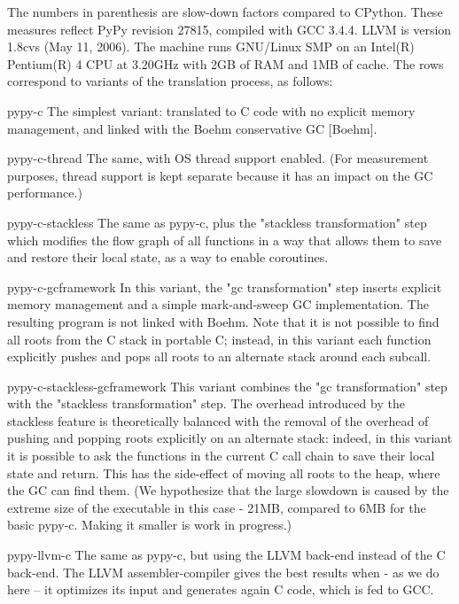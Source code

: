 \documentclass{acm_proc_article-sp}
\begin{document}
The numbers in parenthesis are slow-down factors compared to CPython.
These measures reflect PyPy revision 27815, compiled with GCC 3.4.4.
LLVM is version 1.8cvs (May 11, 2006).  The machine runs GNU/Linux SMP
on an Intel(R) Pentium(R) 4 CPU at 3.20GHz with 2GB of RAM and 1MB of
cache.  The rows correspond to variants of the translation process, as
follows:

pypy-c
    The simplest variant: translated to C code with no explicit memory
    management, and linked with the Boehm conservative GC [Boehm].

pypy-c-thread
    The same, with OS thread support enabled.  (For measurement purposes,
    thread support is kept separate because it has an impact on the GC
    performance.)

pypy-c-stackless
    The same as pypy-c, plus the "stackless transformation" step which
    modifies the flow graph of all functions in a way that allows them
    to save and restore their local state, as a way to enable coroutines.

pypy-c-gcframework
    In this variant, the "gc transformation" step inserts explicit
    memory management and a simple mark-and-sweep GC implementation.
    The resulting program is not linked with Boehm.  Note that it is not
    possible to find all roots from the C stack in portable C; instead,
    in this variant each function explicitly pushes and pops all roots
    to an alternate stack around each subcall.

pypy-c-stackless-gcframework
    This variant combines the "gc transformation" step with the
    "stackless transformation" step.  The overhead introduced by the
    stackless feature is theoretically balanced with the removal of the
    overhead of pushing and popping roots explicitly on an alternate
    stack: indeed, in this variant it is possible to ask the functions
    in the current C call chain to save their local state and return.
    This has the side-effect of moving all roots to the heap, where the
    GC can find them.  (We hypothesize that the large slowdown is caused
    by the extreme size of the executable in this case - 21MB, compared to
    6MB for the basic pypy-c.  Making it smaller is work in progress.)

pypy-llvm-c
    The same as pypy-c, but using the LLVM back-end instead of the C
    back-end.  The LLVM assembler-compiler gives the best results when -
    as we do here -- it optimizes its input and generates again C code,
    which is fed to GCC.
\end{document}
